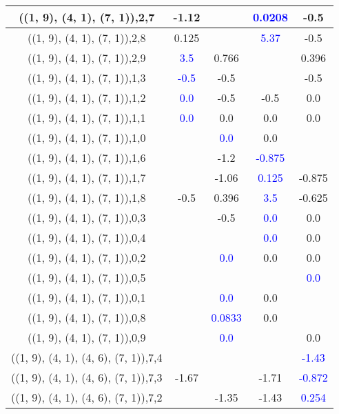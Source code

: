 \documentclass{article}
\begin{document}
\begin{center}
\begin{longtable}{|c|c|c|c|c|}
        	\hline
        	((1, 9), (4, 1), (7, 1)),2,7&-1.12&& \textcolor{blue}{0.0208}&-0.5\\
        	\hline
        	((1, 9), (4, 1), (7, 1)),2,8&0.125&& \textcolor{blue}{5.37}&-0.5\\
        	\hline
        	((1, 9), (4, 1), (7, 1)),2,9& \textcolor{blue}{3.5}&0.766&&0.396\\
        	\hline
        	((1, 9), (4, 1), (7, 1)),1,3& \textcolor{blue}{-0.5}&-0.5&&-0.5\\
        	\hline
        	((1, 9), (4, 1), (7, 1)),1,2& \textcolor{blue}{0.0}&-0.5&-0.5&0.0\\
        	\hline
        	((1, 9), (4, 1), (7, 1)),1,1& \textcolor{blue}{0.0}&0.0&0.0&0.0\\
        	\hline
        	((1, 9), (4, 1), (7, 1)),1,0&& \textcolor{blue}{0.0}&0.0&\\
        	\hline
        	((1, 9), (4, 1), (7, 1)),1,6&&-1.2& \textcolor{blue}{-0.875}&\\
        	\hline
        	((1, 9), (4, 1), (7, 1)),1,7&&-1.06& \textcolor{blue}{0.125}&-0.875\\
        	\hline
        	((1, 9), (4, 1), (7, 1)),1,8&-0.5&0.396& \textcolor{blue}{3.5}&-0.625\\
        	\hline
        	((1, 9), (4, 1), (7, 1)),0,3&&-0.5& \textcolor{blue}{0.0}&0.0\\
        	\hline
        	((1, 9), (4, 1), (7, 1)),0,4&&& \textcolor{blue}{0.0}&0.0\\
        	\hline
        	((1, 9), (4, 1), (7, 1)),0,2&& \textcolor{blue}{0.0}&0.0&0.0\\
        	\hline
        	((1, 9), (4, 1), (7, 1)),0,5&&&& \textcolor{blue}{0.0}\\
        	\hline
        	((1, 9), (4, 1), (7, 1)),0,1&& \textcolor{blue}{0.0}&0.0&\\
        	\hline
        	((1, 9), (4, 1), (7, 1)),0,8&& \textcolor{blue}{0.0833}&0.0&\\
        	\hline
        	((1, 9), (4, 1), (7, 1)),0,9&& \textcolor{blue}{0.0}&&0.0\\
        	\hline
        	((1, 9), (4, 1), (4, 6), (7, 1)),7,4&&&& \textcolor{blue}{-1.43}\\
        	\hline
        	((1, 9), (4, 1), (4, 6), (7, 1)),7,3&-1.67&&-1.71& \textcolor{blue}{-0.872}\\
        	\hline
        	((1, 9), (4, 1), (4, 6), (7, 1)),7,2&&-1.35&-1.43& \textcolor{blue}{0.254}\\

\end{longtable}
\end{center}
\end{document}
